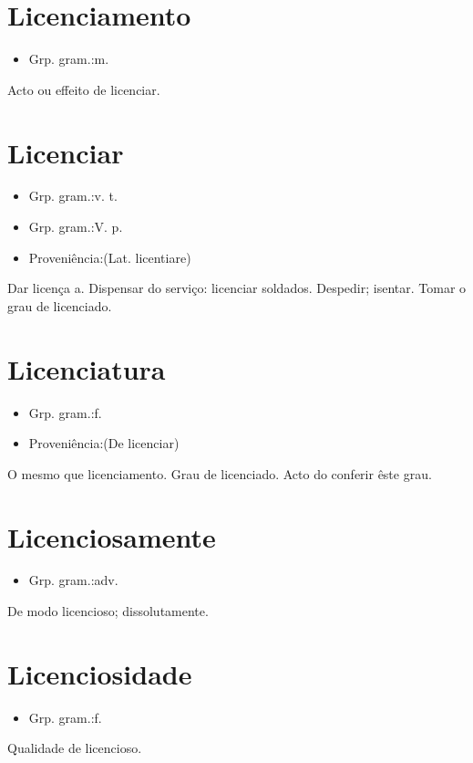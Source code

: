 \section{Licenciamento}
\begin{itemize}
\item {Grp. gram.:m.}
\end{itemize}
Acto ou effeito de licenciar.
\section{Licenciar}
\begin{itemize}
\item {Grp. gram.:v. t.}
\end{itemize}
\begin{itemize}
\item {Grp. gram.:V. p.}
\end{itemize}
\begin{itemize}
\item {Proveniência:(Lat. \textunderscore licentiare\textunderscore )}
\end{itemize}
Dar licença a.
Dispensar do serviço: \textunderscore licenciar soldados\textunderscore .
Despedir; isentar.
Tomar o grau de licenciado.
\section{Licenciatura}
\begin{itemize}
\item {Grp. gram.:f.}
\end{itemize}
\begin{itemize}
\item {Proveniência:(De \textunderscore licenciar\textunderscore )}
\end{itemize}
O mesmo que \textunderscore licenciamento\textunderscore .
Grau de licenciado.
Acto do conferir êste grau.
\section{Licenciosamente}
\begin{itemize}
\item {Grp. gram.:adv.}
\end{itemize}
De modo licencioso; dissolutamente.
\section{Licenciosidade}
\begin{itemize}
\item {Grp. gram.:f.}
\end{itemize}
Qualidade de licencioso.
